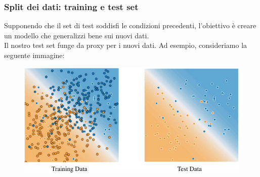 \begin{frame}

	\frametitle{Split dei dati: training e test set}

	Supponendo che il set di test soddisfi le condizioni precedenti, l'obiettivo è creare un modello che generalizzi bene sui nuovi dati.\\
	Il nostro test set funge da proxy per i nuovi dati.
	\newlinedouble
	Ad esempio, consideriamo la seguente immagine:
	\begin{figure}[!htbp]
		\centering
		\includegraphics[width=0.8\linewidth]{images/supervised/validation_test_splitting_data/TrainingDataVsTestData.pdf}
	\end{figure}

%
%
%
\end{frame}


